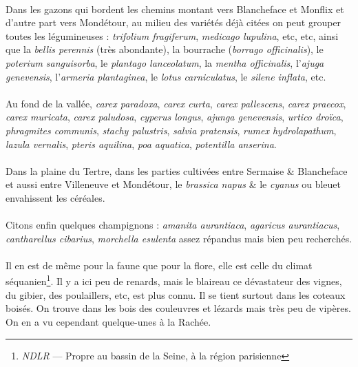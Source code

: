 \documentclass[../eBook.tex]{subfiles}
\begin{document}
    \paragraph{}Dans les gazons qui bordent les chemins montant vers Blancheface et Monflix et d'autre part vers Mondétour, au milieu des variétés déjà citées on peut grouper toutes les légumineuses : \textit{trifolium fragiferum}, \textit{medicago lupulina}, etc, etc, ainsi que la \textit{bellis perennis} (très abondante), la bourrache (\textit{borrago officinalis}), le \textit{poterium sanguisorba}, le \textit{plantago lanceolatum}, la \textit{mentha officinalis}, l'\textit{ajuga genevensis}, l'\textit{armeria plantaginea}, le \textit{lotus carniculatus}, le \textit{silene inflata}, etc.
    \paragraph{}Au fond de la vallée, \textit{carex paradoxa}, \textit{carex curta}, \textit{carex pallescens}, \textit{carex praecox}, \textit{carex muricata}, \textit{carex paludosa}, \textit{cyperus longus}, \textit{ajunga genevensis}, \textit{urtico droïca}, \textit{phragmites communis}, \textit{stachy palustris}, \textit{salvia pratensis}, \textit{rumex hydrolapathum}, \textit{lazula vernalis}, \textit{pteris aquilina}, \textit{poa aquatica}, \textit{potentilla anserina}.
    \paragraph{}Dans la plaine du Tertre, dans les parties cultivées entre Sermaise \& Blancheface et aussi entre Villeneuve et Mondétour, le \textit{brassica napus} \& le \textit{cyanus} ou bleuet envahissent les céréales.
    \paragraph{}Citons enfin quelques champignons : \textit{amanita aurantiaca}, \textit{agaricus aurantiacus}, \textit{cantharellus cibarius}, \textit{morchella esulenta} assez répandus mais bien peu recherchés.
    \paragraph{}Il en est de même pour la faune que pour la flore, elle est celle du climat séquanien\footnote{\textit{NDLR} --- Propre au bassin de la Seine, à la région parisienne}. Il y a ici peu de renards, mais le blaireau ce dévastateur des vignes, du gibier, des poulaillers, etc, est plus connu. Il se tient surtout dans les coteaux boisés. On trouve dans les bois des couleuvres et lézards mais très peu de vipères. On en a vu cependant quelque-unes à la Rachée.
\end{document}
